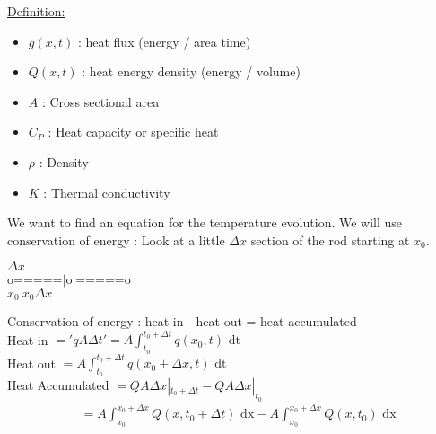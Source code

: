 \documentclass{article}
\newcommand{\dfn}{\underline{Definition:} }
\begin{document}
\dfn
\begin{itemize}
  \item $g(x, t)$ : heat flux (energy / area time)
  \item $Q(x, t)$ : heat energy density (energy / volume)
  \item $A$ : Cross sectional area
  \item $C_P$ : Heat capacity or specific heat
  \item $\rho$ : Density
  \item $K$ : Thermal conductivity
\end{itemize}
We want to find an equation for the temperature evolution. We will use conservation of energy : Look at a little $\Delta x$ section of the rod starting at $x_0$.
\begin{center}
  $\Delta x$\\
  o=====$|$o$|$=====o\\
  $x_0\  x_0\Delta x$
\end{center}
Conservation of energy : heat in - heat out = heat accumulated\\
Heat in $ = 'qA\Delta t' = A \int_{t_0}^{t_0 + \Delta t} q(x_0, t) \text{ dt}$\\
Heat out $ = A\int_{t_0}^{t_0 + \Delta t} q(x_0 + \Delta x, t) \text{ dt}$\\
Heat Accumulated $ = QA\Delta x |_{t_0 + \Delta t} - QA\Delta x|_{t_0}$
\begin{align}
  & = A\int^{x_0 + \Delta x}_{x_0} Q(x, t_0 + \Delta t) \text{ dx} - A\int^{x_0 + \Delta x}_{x_0} Q(x, t_0) \text{ dx}
\end{align}
\end{document}

